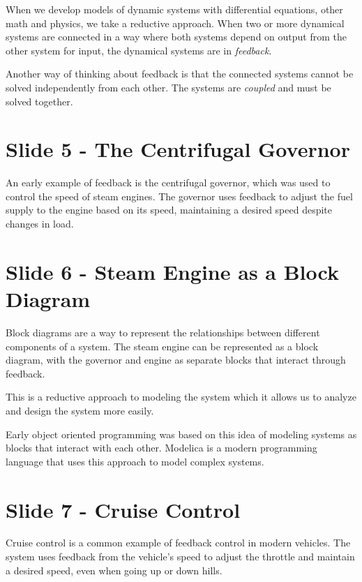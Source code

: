 \documentclass[
  letterpaper,
  DIV=11,
  numbers=noendperiod]{scrreprt}
\begin{document}
When we develop models of dynamic systems with differential equations,
other math and physics, we take a reductive approach. When two or more
dynamical systems are connected in a way where both systems depend on
output from the other system for input, the dynamical systems are in
\emph{feedback}.

Another way of thinking about feedback is that the connected systems
cannot be solved independently from each other. The systems are
\emph{coupled} and must be solved together.

\section{Slide 5 - The Centrifugal
Governor}\label{slide-5---the-centrifugal-governor}

An early example of feedback is the centrifugal governor, which was used
to control the speed of steam engines. The governor uses feedback to
adjust the fuel supply to the engine based on its speed, maintaining a
desired speed despite changes in load.

\section{Slide 6 - Steam Engine as a Block
Diagram}\label{slide-6---steam-engine-as-a-block-diagram}

Block diagrams are a way to represent the relationships between
different components of a system. The steam engine can be represented as
a block diagram, with the governor and engine as separate blocks that
interact through feedback.

This is a reductive approach to modeling the system which it allows us
to analyze and design the system more easily.

Early object oriented programming was based on this idea of modeling
systems as blocks that interact with each other. Modelica is a modern
programming language that uses this approach to model complex systems.

\section{Slide 7 - Cruise Control}\label{slide-7---cruise-control}

Cruise control is a common example of feedback control in modern
vehicles. The system uses feedback from the vehicle's speed to adjust
the throttle and maintain a desired speed, even when going up or down
hills.
\end{document}
